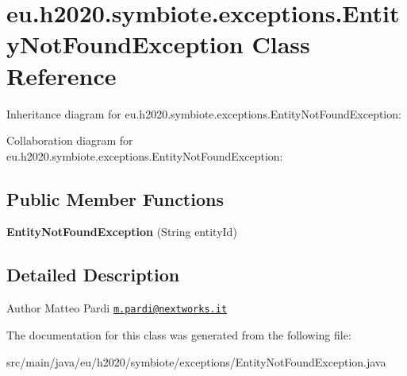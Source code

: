 \hypertarget{classeu_1_1h2020_1_1symbiote_1_1exceptions_1_1EntityNotFoundException}{}\section{eu.\+h2020.\+symbiote.\+exceptions.\+Entity\+Not\+Found\+Exception Class Reference}
\label{classeu_1_1h2020_1_1symbiote_1_1exceptions_1_1EntityNotFoundException}


Inheritance diagram for eu.\+h2020.\+symbiote.\+exceptions.\+Entity\+Not\+Found\+Exception\+:


Collaboration diagram for eu.\+h2020.\+symbiote.\+exceptions.\+Entity\+Not\+Found\+Exception\+:
\subsection*{Public Member Functions}
\begin{DoxyCompactItemize}
\item 
\mbox{\label{classeu_1_1h2020_1_1symbiote_1_1exceptions_1_1EntityNotFoundException_a6dd29335e151a4fc00b9cd885afdfabc}} 
{\bfseries Entity\+Not\+Found\+Exception} (String entity\+Id)
\end{DoxyCompactItemize}


\subsection{Detailed Description}
\begin{DoxyAuthor}{Author}
Matteo Pardi \href{mailto:m.pardi@nextworks.it}{\tt m.\+pardi@nextworks.\+it} 
\end{DoxyAuthor}


The documentation for this class was generated from the following file\+:\begin{DoxyCompactItemize}
\item 
src/main/java/eu/h2020/symbiote/exceptions/Entity\+Not\+Found\+Exception.\+java\end{DoxyCompactItemize}
